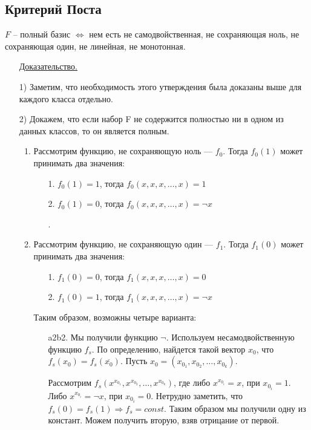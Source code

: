 \documentclass{article}
\begin{document}
\subsection{Критерий Поста}
$F$ --  полный базис $\Leftrightarrow$ нем есть не самодвойственная, не сохраняющая ноль, не сохраняющая один, не линейная, не монотонная.

\begin{enumerate}
\item[] \uline{Доказательство.}
\item[1)] Заметим, что необходимость этого утверждения была доказаны выше для каждого класса отдельно.

 \item[2)]Докажем, что если набор F не содержится полностью ни в одном из данных классов, то он является полным.

\begin{enumerate}
    \item  Рассмотрим функцию, не сохраняющую ноль --- $f_0$. Тогда $f_0(1)$ может принимать два значения:
     \begin{enumerate}
        \item[1.] $f_0(1)=1$, тогда $f_0(x,x,x,\ldots,x)=1$
        \item[2.] $f_0(1)=0$, тогда $f_0(x,x,x,\ldots,x)=\neg x$

.
    \end{enumerate}
    \item Рассмотрим функцию, не сохраняющую один — $f_1$. Тогда $f_1(0)$ может принимать два значения:
    \begin{enumerate}
        \item[1.]$f_1(0)=0$, тогда $f_1(x,x,x,\ldots,x)=0$
        \item[2.]$f_1(0)=1$, тогда $f_1(x,x,x,\ldots,x)=\neg x$
    \end{enumerate}
    Таким образом, возможны четыре варианта:
    \begin{enumerate}
        \item[a2b2.] Мы получили функцию $\neg$.
        Используем несамодвойственную функцию $f_s$. По определению, найдется такой вектор $x_0$, что $f_s(x_0)=f_s(\overline{x_0})$. Пусть $x_0=(x_{0_1},x_{0_2},\ldots,x_{0_k})$.
        
        Рассмотрим $f_s(x^{x_{0_1}},x^{x_{0_2}},\ldots,x^{x_{0_{k}}})$, где либо $x^{x_{0_i}}=x$, при $x_{0_i}=1$. Либо $x^{x_{0_i}}=\neg x$, при $x_{0_i}=0$. Нетрудно заметить, что $f_s(0)=f_s(1) \Rightarrow  f_s=const$. Таким образом мы получили одну из констант. Можем получить вторую, взяв отрицание от первой.


\end{enumerate}
\end{enumerate}
\end{enumerate}
\end{document}
